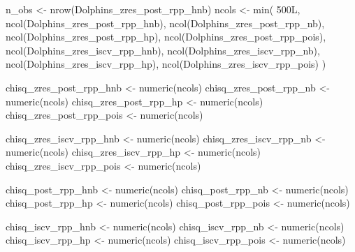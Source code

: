 \documentclass[
  english,
  letterpaper,
  DIV=11,
  numbers=noendperiod]{scrartcl}
\newenvironment{Shaded}{\begin{snugshade}}{\end{snugshade}}
\newcommand{\DecValTok}[1]{\textcolor[rgb]{0.68,0.00,0.00}{#1}}
\newcommand{\FunctionTok}[1]{\textcolor[rgb]{0.28,0.35,0.67}{#1}}
\newcommand{\NormalTok}[1]{\textcolor[rgb]{0.00,0.23,0.31}{#1}}
\newcommand{\OtherTok}[1]{\textcolor[rgb]{0.00,0.23,0.31}{#1}}
\begin{document}
\begin{Shaded}
\begin{Highlighting}[]
\NormalTok{n\_obs }\OtherTok{\textless{}{-}} \FunctionTok{nrow}\NormalTok{(Dolphins\_zres\_post\_rpp\_hnb)}
\NormalTok{ncols }\OtherTok{\textless{}{-}} \FunctionTok{min}\NormalTok{(}
  \DecValTok{500}\NormalTok{L,}
  \FunctionTok{ncol}\NormalTok{(Dolphins\_zres\_post\_rpp\_hnb),}
  \FunctionTok{ncol}\NormalTok{(Dolphins\_zres\_post\_rpp\_nb),}
  \FunctionTok{ncol}\NormalTok{(Dolphins\_zres\_post\_rpp\_hp),}
  \FunctionTok{ncol}\NormalTok{(Dolphins\_zres\_post\_rpp\_pois),}
  \FunctionTok{ncol}\NormalTok{(Dolphins\_zres\_iscv\_rpp\_hnb),}
  \FunctionTok{ncol}\NormalTok{(Dolphins\_zres\_iscv\_rpp\_nb),}
  \FunctionTok{ncol}\NormalTok{(Dolphins\_zres\_iscv\_rpp\_hp),}
  \FunctionTok{ncol}\NormalTok{(Dolphins\_zres\_iscv\_rpp\_pois)}
\NormalTok{)}

\NormalTok{chisq\_zres\_post\_rpp\_hnb  }\OtherTok{\textless{}{-}} \FunctionTok{numeric}\NormalTok{(ncols)}
\NormalTok{chisq\_zres\_post\_rpp\_nb   }\OtherTok{\textless{}{-}} \FunctionTok{numeric}\NormalTok{(ncols)}
\NormalTok{chisq\_zres\_post\_rpp\_hp   }\OtherTok{\textless{}{-}} \FunctionTok{numeric}\NormalTok{(ncols)}
\NormalTok{chisq\_zres\_post\_rpp\_pois }\OtherTok{\textless{}{-}} \FunctionTok{numeric}\NormalTok{(ncols)}

\NormalTok{chisq\_zres\_iscv\_rpp\_hnb  }\OtherTok{\textless{}{-}} \FunctionTok{numeric}\NormalTok{(ncols)}
\NormalTok{chisq\_zres\_iscv\_rpp\_nb   }\OtherTok{\textless{}{-}} \FunctionTok{numeric}\NormalTok{(ncols)}
\NormalTok{chisq\_zres\_iscv\_rpp\_hp   }\OtherTok{\textless{}{-}} \FunctionTok{numeric}\NormalTok{(ncols)}
\NormalTok{chisq\_zres\_iscv\_rpp\_pois }\OtherTok{\textless{}{-}} \FunctionTok{numeric}\NormalTok{(ncols)}

\NormalTok{chisq\_post\_rpp\_hnb  }\OtherTok{\textless{}{-}} \FunctionTok{numeric}\NormalTok{(ncols)}
\NormalTok{chisq\_post\_rpp\_nb   }\OtherTok{\textless{}{-}} \FunctionTok{numeric}\NormalTok{(ncols)}
\NormalTok{chisq\_post\_rpp\_hp   }\OtherTok{\textless{}{-}} \FunctionTok{numeric}\NormalTok{(ncols)}
\NormalTok{chisq\_post\_rpp\_pois }\OtherTok{\textless{}{-}} \FunctionTok{numeric}\NormalTok{(ncols)}

\NormalTok{chisq\_iscv\_rpp\_hnb  }\OtherTok{\textless{}{-}} \FunctionTok{numeric}\NormalTok{(ncols)}
\NormalTok{chisq\_iscv\_rpp\_nb   }\OtherTok{\textless{}{-}} \FunctionTok{numeric}\NormalTok{(ncols)}
\NormalTok{chisq\_iscv\_rpp\_hp   }\OtherTok{\textless{}{-}} \FunctionTok{numeric}\NormalTok{(ncols)}
\NormalTok{chisq\_iscv\_rpp\_pois }\OtherTok{\textless{}{-}} \FunctionTok{numeric}\NormalTok{(ncols)}


\end{Highlighting}
\end{Shaded}
\end{document}
